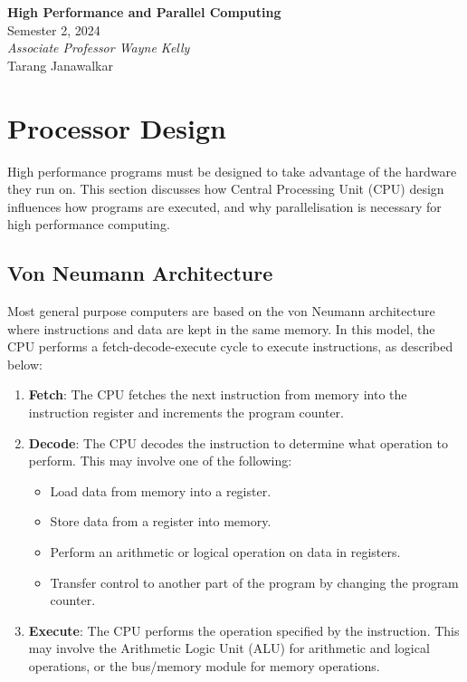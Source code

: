 \documentclass{article}
\date{}
\newcommand{\unitName}{High Performance and Parallel Computing}
\newcommand{\unitTime}{Semester 2, 2024}
\newcommand{\unitCoordinator}{Associate Professor Wayne Kelly}
\newcommand{\documentAuthors}{Tarang Janawalkar}
\begin{document}
%
\begin{titlepage}
    \vspace*{\fill}
    \begin{center}
        \LARGE{\textbf{\unitName}} \\[0.1in]
        \normalsize{\unitTime} \\[0.2in]
        \normalsize\textit{\unitCoordinator} \\[0.2in]
        \documentAuthors
    \end{center}
    \vspace*{\fill}
    \doclicenseThis
    \thispagestyle{empty}
\end{titlepage}
\newpage
%
\tableofcontents
\newpage
%
\section{Processor Design}
High performance programs must be designed to take advantage of the
hardware they run on. This section discusses how Central Processing
Unit (CPU) design influences how programs are executed, and why
parallelisation is necessary for high performance computing.
\subsection{Von Neumann Architecture}
Most general purpose computers are based on the von Neumann
architecture where instructions and data are kept in the same memory.
In this model, the CPU performs a fetch-decode-execute cycle to execute
instructions, as described below:
\begin{enumerate}
    \item \textbf{Fetch}: The CPU fetches the next instruction from memory into
          the instruction register and increments the program counter.
    \item \textbf{Decode}: The CPU decodes the instruction to determine what
          operation to perform. This may involve one of the following:
          \begin{itemize}
              \item Load data from memory into a register.
              \item Store data from a register into memory.
              \item Perform an arithmetic or logical operation on data
                    in registers.
              \item Transfer control to another part of the program by
                    changing the program counter.
          \end{itemize}
    \item \textbf{Execute}: The CPU performs the operation specified by
          the instruction. This may involve the Arithmetic Logic Unit
          (ALU) for arithmetic and logical operations, or the bus/memory
          module for memory operations.
\end{enumerate}
\end{document}
